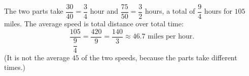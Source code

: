 The two parts take $\dfrac{30}{40}=\dfrac{3}{4}$ hour and $\dfrac{75}{50}=\dfrac{3}{2}$ hours, a total of $\dfrac{9}{4}$ hours for $105$ miles. The average speed is total distance over total time:
\[
\dfrac{105}{\dfrac{9}{4}}=\dfrac{420}{9}=\boxed{\dfrac{140}{3}}\approx46.7\text{ miles per hour}.
\]
(It is not the average $45$ of the two speeds, because the parts take different times.)
